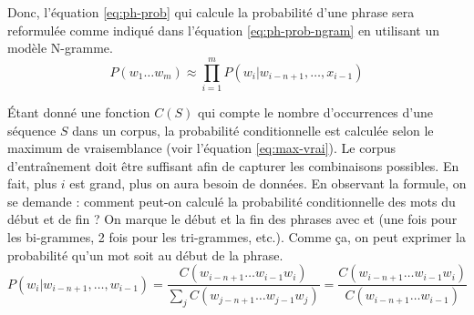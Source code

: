 \documentclass{KodeBook}
\begin{document}
Donc, l'équation \ref{eq:ph-prob} qui calcule la probabilité d'une phrase sera reformulée comme indiqué dans l'équation \ref{eq:ph-prob-ngram} en utilisant un modèle N-gramme.
\begin{equation}\label{eq:ph-prob-ngram}
	P(w_1 \ldots w_m) \approx \prod_{i=1}^{m} P(w_i | w_{i-n+1}, \ldots, x_{i-1})
\end{equation}

Étant donné une fonction $C(S)$ qui compte le nombre d'occurrences d'une séquence $S$ dans un corpus, la probabilité conditionnelle est calculée selon le maximum de vraisemblance (voir l'équation \ref{eq:max-vrai}).
Le corpus d'entraînement doit être suffisant afin de capturer les combinaisons possibles. 
En fait, plus $i$ est grand, plus on aura besoin de données.
En observant la formule, on se demande : comment peut-on calculé la probabilité conditionnelle des mots du début et de fin ?
On marque le début et la fin des phrases avec  et  (une fois pour les bi-grammes, 2 fois pour les tri-grammes, etc.). 
Comme ça, on peut exprimer la probabilité qu'un mot soit au début de la phrase.
\begin{equation}
	P(w_i | w_{i-n+1},\ldots, w_{i-1}) 
	= \frac{C(w_{i-n+1} \ldots w_{i-1} w_i)}{\sum_j C(w_{j-n+1} \ldots w_{j-1} w_j)}
	= \frac{C(w_{i-n+1} \ldots w_{i-1} w_i)}{C(w_{i-n+1} \ldots w_{i-1})}
	\label{eq:max-vrai}
\end{equation}
\end{document}
